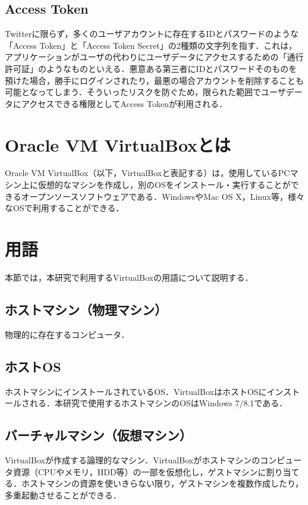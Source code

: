 \subsection{Access Token}
Twitterに限らず，多くのユーザアカウントに存在するIDとパスワードのような「Access Token」と「Access Token Secret」の2種類の文字列を指す．これは，アプリケーションがユーザの代わりにユーザデータにアクセスするための「通行許可証」のようなものといえる．悪意ある第三者にIDとパスワードそのものを預けた場合，勝手にログインされたり，最悪の場合アカウントを削除することも可能となってしまう．そういったリスクを防ぐため，限られた範囲でユーザデータにアクセスできる権限としてAccess Tokenが利用される\cite{whatsAccessToken}．

\section{Oracle VM VirtualBoxとは}
Oracle VM VirtualBox（以下，VirtualBoxと表記する）は，使用しているPCマシン上に仮想的なマシンを作成し，別のOSをインストール・実行することができるオープンソースソフトウェアである．WindowsやMac OS X，Linux等，様々なOSで利用することができる\cite{VBoxMania}．

\section{用語}
本節では，本研究で利用するVirtualBoxの用語について説明する．

\subsection{ホストマシン（物理マシン）}
物理的に存在するコンピュータ．

\subsection{ホストOS}
ホストマシンにインストールされているOS．VirtualBoxはホストOSにインストールされる．本研究で使用するホストマシンのOSはWindows 7/8.1である． 

\subsection{バーチャルマシン（仮想マシン）}
VirtualBoxが作成する論理的なマシン．VirtualBoxがホストマシンのコンピュータ資源（CPUやメモリ，HDD等）の一部を仮想化し，ゲストマシンに割り当てる．ホストマシンの資源を使いきらない限り，ゲストマシンを複数作成したり，多重起動させることができる．

